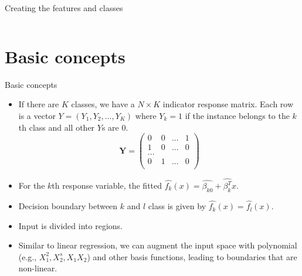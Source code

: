 \documentclass[aspectratio=169]{beamer}
\let \vec \mathbf
\begin{document}
\begin{frame}[fragile]{Creating the features and classes}
\inputminted{python}{example_element_features.py}
\end{frame} 


\section{Basic concepts}

\begin{frame}{Basic concepts}
    \begin{itemize}
        \item If there are $K$ classes, we have a $N \times K$ indicator response matrix. Each row is a vector $Y = (Y_1, Y_2, ..., Y_K)$ where $Y_k = 1$ if the instance belongs to the $k$th class and all other $Y$s are 0.
        \begin{equation*}
            \vec{Y} = \begin{pmatrix}
            0 & 0 & ... & 1\\
            1 & 0 & ... & 0\\
            ...& & &\\
            0 & 1 & ... & 0\\
            \end{pmatrix}
        \end{equation*}
        \item For the $k$th response variable, the fitted $\hat{f_k}(x) = \hat{\beta_{k0}} + \hat{\beta_{k}^T}x$.
        \item Decision boundary between $k$ and $l$ class is given by $\hat{f_k}(x) = \hat{f_l}(x)$. 
        \item Input is divided into regions.
        \item Similar to linear regression, we can augment the input space with polynomial (e.g., $X_1^2, X_2^s, X_1X_2$) and other basis functions, leading to boundaries that are non-linear.
    \end{itemize}
\end{frame} 
\end{document}
